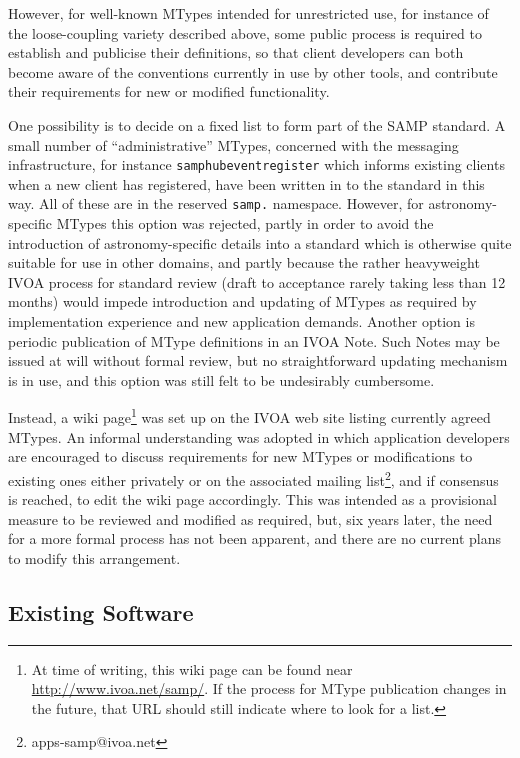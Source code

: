 \documentclass[5p]{elsarticle}
\begin{document}
However, for well-known MTypes intended for unrestricted use,
for instance of the loose-coupling variety described above,
some public process is required to establish
and publicise their definitions, so that client developers can
both become aware of the conventions currently in use by other tools,
and contribute their requirements for new or modified functionality.

One possibility
is to decide on a fixed list to form part of the SAMP standard.
A small number of ``administrative'' MTypes,
concerned with the messaging infrastructure,
for instance {\tt samp{\kdot}hub{\kdot}event{\kdot}register}
which informs existing clients when a new client has registered,
have been written in to the standard in this way.
All of these are in the reserved {\tt samp.} namespace.
However, for astronomy-specific MTypes this option was rejected,
partly in order to avoid the introduction of astronomy-specific details
into a standard which is otherwise quite suitable for use in other domains,
and partly because the rather heavyweight IVOA process for
standard review \citep{ivoadoc}
(draft to acceptance rarely taking less than 12 months)
would impede introduction and updating of MTypes as required
by implementation experience and new application demands.
Another option is periodic publication of MType definitions
in an IVOA Note.  Such Notes may be issued at will without formal review,
but no straightforward updating mechanism is in use,
and this option was still felt to be undesirably cumbersome.

Instead, a wiki page\footnote{
  At time of writing, this wiki page can be found near
  \url{http://www.ivoa.net/samp/}.
  If the process for MType publication changes in the future,
  that URL should still indicate where to look for a list.}
was set up on the IVOA web site listing currently agreed MTypes.
An informal understanding was adopted in which
application developers are encouraged to discuss requirements for
new MTypes or modifications to existing ones either privately or
on the associated mailing list\footnote{apps-samp@ivoa.net}, 
and if consensus is reached, to edit the wiki page accordingly.
This was intended as a provisional measure to be reviewed and
modified as required, but, six years later, the need for a more
formal process has not been apparent, and there are no current
plans to modify this arrangement.

\subsection{Existing Software} \label{sec:software}
\end{document}
